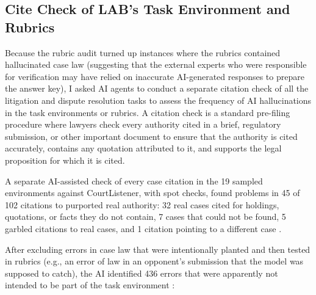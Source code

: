 \documentclass[11pt]{article}
\newcommand{\labSampleTasks}{19}
\begin{document}
\subsection{Cite Check of LAB's Task Environment and Rubrics}
\label{sec:citecheck}
Because the rubric audit turned up instances where the rubrics contained hallucinated case law (suggesting that the external experts who were responsible for verification may have relied on inaccurate AI-generated responses to prepare the answer key), I asked AI agents to conduct a separate citation check of all the litigation and dispute resolution tasks to assess the frequency of AI hallucinations in the task environments or rubrics. A citation check is a standard pre-filing procedure where lawyers check every authority cited in a brief, regulatory submission, or other important document to ensure that the authority is cited accurately, contains any quotation attributed to it, and supports the legal proposition for which it is cited.

A separate AI-assisted check of every case citation in the \labSampleTasks{} sampled environments against CourtListener, with spot checks, found problems in 45 of 102 citations to purported real authority: 32 real cases cited for holdings, quotations, or facts they do not contain, 7 cases that could not be found, 5 garbled citations to real cases, and 1 citation pointing to a different case \citep{labreview}.

After excluding errors in case law that were intentionally planted and then tested in rubrics (e.g., an error of law in an opponent's submission that the model was supposed to catch), the AI identified 436 errors that were apparently not intended to be part of the task environment \citep{labcitecheck}:
\end{document}

